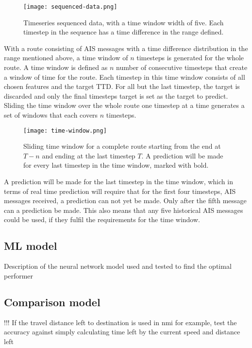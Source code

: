 \documentclass[../main.tex]{subfiles}
\begin{document}
\begin{figure}[H]
	\centering
	\texttt{[image: sequenced-data.png]}
	\caption{Timeseries sequenced data, with a time window width of five. Each timestep in the sequence has a time difference in the range defined.}
	\label{fig:seq-data}
\end{figure}

With a route consisting of AIS messages with a time difference distribution in the range mentioned above, a time window of $n$ timesteps is generated for the whole route. A time window is defined as $n$ number of consecutive timesteps that create a window of time for the route. Each timestep in this time window consists of all chosen features and the target TTD. For all but the last timestep, the target is discarded and only the final timesteps target is set as the target to predict. Sliding the time window over the whole route one timestep at a time generates a set of windows that each covers $n$ timesteps. 

\begin{figure}[H]
	\centering
	\texttt{[image: time-window.png]}
	\caption{Sliding time window for a complete route starting from the end at $T-n$ and ending at the last timestep $T$. A prediction will be made for every last timestep in the time window, marked with bold.}
	\label{fig:time-window}
\end{figure}

A prediction will be made for the last timestep in the time window, which in terms of real time prediction will require that for the first four timesteps, AIS messages received, a prediction can not yet be made. Only after the fifth message can a prediction be made. This also means that any five historical AIS messages could be used, if they fulfil the requirements for the time window.


\subsection{ML model}

Description of the neural network model used and tested to find the optimal performer


\subsection{Comparison model}

!!! If the travel distance left to destination is used in nmi for example, test the accuracy against simply calculating time left by the current speed and distance left 
\end{document}
